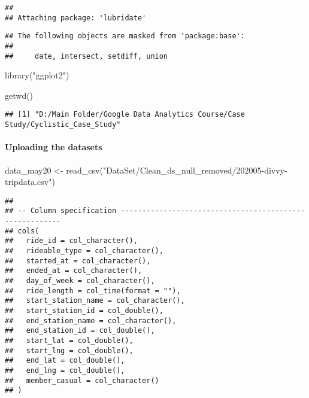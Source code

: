 \documentclass[
]{article}
\newenvironment{Shaded}{\begin{snugshade}}{\end{snugshade}}
\newcommand{\FunctionTok}[1]{\textcolor[rgb]{0.00,0.00,0.00}{#1}}
\newcommand{\NormalTok}[1]{#1}
\newcommand{\OtherTok}[1]{\textcolor[rgb]{0.56,0.35,0.01}{#1}}
\newcommand{\StringTok}[1]{\textcolor[rgb]{0.31,0.60,0.02}{#1}}
\begin{document}
\begin{verbatim}
## 
## Attaching package: 'lubridate'
\end{verbatim}

\begin{verbatim}
## The following objects are masked from 'package:base':
## 
##     date, intersect, setdiff, union
\end{verbatim}

\begin{Shaded}
\begin{Highlighting}[]
\FunctionTok{library}\NormalTok{(}\StringTok{"ggplot2"}\NormalTok{)}
\end{Highlighting}
\end{Shaded}

\begin{Shaded}
\begin{Highlighting}[]
\FunctionTok{getwd}\NormalTok{()}
\end{Highlighting}
\end{Shaded}

\begin{verbatim}
## [1] "D:/Main Folder/Google Data Analytics Course/Case Study/Cyclistic_Case_Study"
\end{verbatim}

\hypertarget{uploading-the-datasets}{%
\paragraph{Uploading the datasets}\label{uploading-the-datasets}}

\begin{Shaded}
\begin{Highlighting}[]
\NormalTok{data\_may20 }\OtherTok{\textless{}{-}} \FunctionTok{read\_csv}\NormalTok{(}\StringTok{"DataSet/Clean\_ds\_null\_removed/202005{-}divvy{-}tripdata.csv"}\NormalTok{)}
\end{Highlighting}
\end{Shaded}

\begin{verbatim}
## 
## -- Column specification --------------------------------------------------------
## cols(
##   ride_id = col_character(),
##   rideable_type = col_character(),
##   started_at = col_character(),
##   ended_at = col_character(),
##   day_of_week = col_character(),
##   ride_length = col_time(format = ""),
##   start_station_name = col_character(),
##   start_station_id = col_double(),
##   end_station_name = col_character(),
##   end_station_id = col_double(),
##   start_lat = col_double(),
##   start_lng = col_double(),
##   end_lat = col_double(),
##   end_lng = col_double(),
##   member_casual = col_character()
## )
\end{verbatim}
\end{document}
